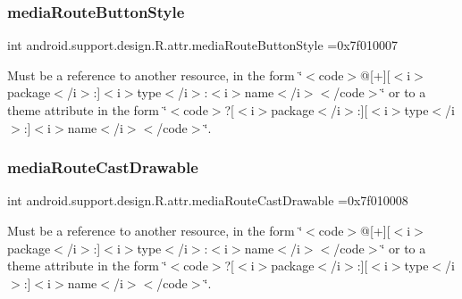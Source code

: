 \subsubsection{\texorpdfstring{media\+Route\+Button\+Style}{mediaRouteButtonStyle}}
{\footnotesize\ttfamily int android.\+support.\+design.\+R.\+attr.\+media\+Route\+Button\+Style =0x7f010007\hspace{0.3cm}{\ttfamily [static]}}

Must be a reference to another resource, in the form \char`\"{}$<$code$>$@\mbox{[}+\mbox{]}\mbox{[}$<$i$>$package$<$/i$>$\+:\mbox{]}$<$i$>$type$<$/i$>$\+:$<$i$>$name$<$/i$>$$<$/code$>$\char`\"{} or to a theme attribute in the form \char`\"{}$<$code$>$?\mbox{[}$<$i$>$package$<$/i$>$\+:\mbox{]}\mbox{[}$<$i$>$type$<$/i$>$\+:\mbox{]}$<$i$>$name$<$/i$>$$<$/code$>$\char`\"{}. \mbox{\label{classandroid_1_1support_1_1design_1_1R_1_1attr_a464d6b9e112de57286fb6553dc472fe6}} 
\subsubsection{\texorpdfstring{media\+Route\+Cast\+Drawable}{mediaRouteCastDrawable}}
{\footnotesize\ttfamily int android.\+support.\+design.\+R.\+attr.\+media\+Route\+Cast\+Drawable =0x7f010008\hspace{0.3cm}{\ttfamily [static]}}

Must be a reference to another resource, in the form \char`\"{}$<$code$>$@\mbox{[}+\mbox{]}\mbox{[}$<$i$>$package$<$/i$>$\+:\mbox{]}$<$i$>$type$<$/i$>$\+:$<$i$>$name$<$/i$>$$<$/code$>$\char`\"{} or to a theme attribute in the form \char`\"{}$<$code$>$?\mbox{[}$<$i$>$package$<$/i$>$\+:\mbox{]}\mbox{[}$<$i$>$type$<$/i$>$\+:\mbox{]}$<$i$>$name$<$/i$>$$<$/code$>$\char`\"{}. \mbox{\label{classandroid_1_1support_1_1design_1_1R_1_1attr_a5c7b9814366fd042e1bff6444e4735c7}} 
